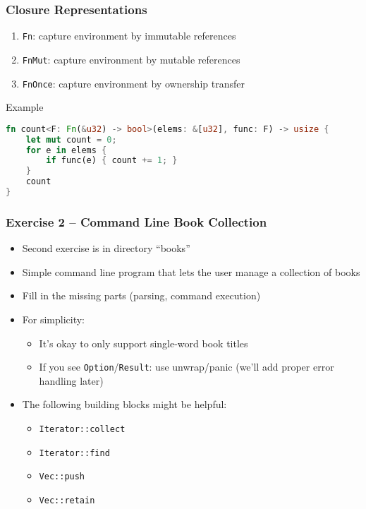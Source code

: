 \begin{frame}[fragile]
    \frametitle{Closure Representations}

    \begin{enumerate}
        \item \texttt{Fn}: capture environment by immutable references
        \item \texttt{FnMut}: capture environment by mutable references
        \item \texttt{FnOnce}: capture environment by ownership transfer
    \end{enumerate}

    \pause

    \begin{exampleblock}{Example}
    \begin{lstlisting}[language=rust]
fn count<F: Fn(&u32) -> bool>(elems: &[u32], func: F) -> usize {
    let mut count = 0;
    for e in elems {
        if func(e) { count += 1; }
    }
    count
}
    \end{lstlisting}
    \end{exampleblock}
\end{frame}

\begin{frame}[fragile]
    \frametitle{Exercise 2 -- Command Line Book Collection}

    \begin{itemize}
        \item Second exercise is in directory ``books''
        \item Simple command line program that lets the user manage a collection of books
        \item Fill in the missing parts (parsing, command execution)
        \item For simplicity:
        \begin{itemize}
            \item It's okay to only support single-word book titles
            \item If you see \texttt{Option}/\texttt{Result}: use unwrap/panic (we'll add proper error handling later)
        \end{itemize}
        \item The following building blocks might be helpful:
        \begin{itemize}
            \item \texttt{Iterator::collect}
            \item \texttt{Iterator::find}
            \item \texttt{Vec::push}
            \item \texttt{Vec::retain}
        \end{itemize}
    \end{itemize}
\end{frame}
